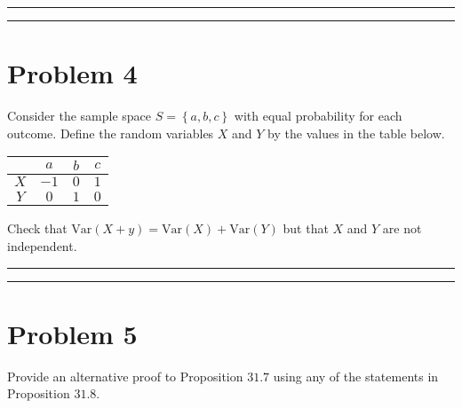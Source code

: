 \documentclass{article}
\theoremstyle{definition}
\newenvironment{solution}{\bigskip\hrule{\hfill}}{\bigskip\hrule{\hfill}} %
\newcommand{\Var}{\text{Var}}
\begin{document}
\begin{solution}


\end{solution}


\newpage


\section*{Problem 4}

Consider the sample space $S=\left\{a,b,c\right\}$ with equal probability for each outcome. Define the random variables $X$ and $Y$ by the values in the table below. 
\begin{center}
    \begin{tabular}{c|ccc}
            & $ a$ & $b$ & $c$ \\\hline
        $X$ & $-1$ & $0$ & $1$ \\
        $Y$ & $ 0$ & $1$ & $0$ \\
    \end{tabular}
\end{center}
Check that $\Var\left(X+y\right)=\Var\left(X\right)+\Var\left(Y\right)$ but that $X$ and $Y$ are not independent.
\begin{solution}


\end{solution}


\newpage


\section*{Problem 5}

Provide an alternative proof to Proposition $31.7$ using any of the statements in Proposition $31.8$.
\end{document}
